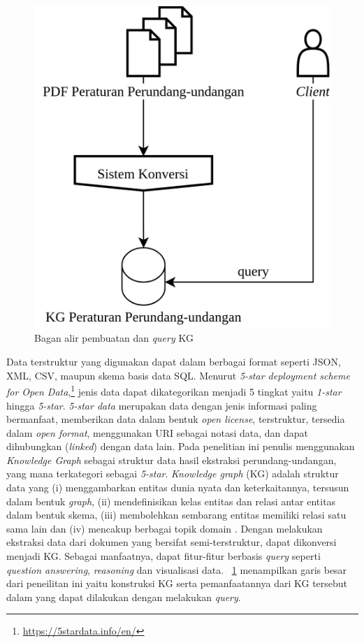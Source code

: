 \begin{figure}[H]
  \centering
  \includegraphics[scale=0.25]{pictures/konstruksi-dan-query.png}
  \caption{Bagan alir pembuatan dan \textit{query} KG \legal}
  \label{fig:konstruksi-dan-query}
\end{figure}

Data terstruktur yang digunakan dapat dalam berbagai format seperti JSON, XML, CSV, maupun skema
basis data SQL. Menurut \textit{5-star deployment scheme for Open
Data},\footnote{\url{https://5stardata.info/en/}} jenis data dapat dikategorikan menjadi 5 tingkat
yaitu \textit{1-star} hingga \textit{5-star}. \textit{5-star data} merupakan data dengan jenis
informasi paling bermanfaat, memberikan data dalam bentuk \textit{open license}, terstruktur,
tersedia dalam \textit{open format}, menggunakan URI sebagai notasi data, dan dapat dihubungkan
(\textit{linked}) dengan data lain. Pada penelitian ini penulis menggunakan \textit{Knowledge Graph}
sebagai struktur data hasil ekstraksi perundang-undangan, yang mana terkategori sebagai
\textit{5-star}. \textit{Knowledge graph} (KG) adalah struktur data yang (i) menggambarkan entitas
dunia nyata dan keterkaitannya, tersusun dalam bentuk \textit{graph}, (ii) mendefinisikan kelas
entitas dan relasi antar entitas dalam bentuk skema, (iii) membolehkan sembarang entitas memiliki
relasi satu sama lain dan (iv) mencakup berbagai topik domain \citep{paulheim_2016}. Dengan
melakukan ekstraksi data dari dokumen yang bersifat semi-terstruktur, \legal dapat dikonversi
menjadi KG. Sebagai manfaatnya, dapat fitur-fitur berbasis \textit{query} seperti \textit{question
answering}, \textit{reasoning} dan visualisasi data. \pic~\ref{fig:konstruksi-dan-query} menampilkan
garis besar dari peneilitan ini yaitu konstruksi KG \legal serta pemanfaatannya dari KG \legal
tersebut dalam yang dapat dilakukan dengan melakukan \textit{query}.

